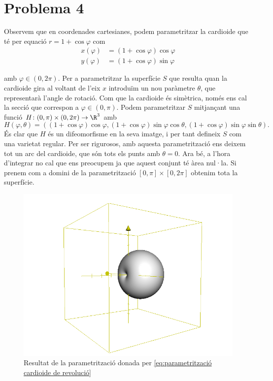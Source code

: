 \documentclass[12pt, a4paper]{article}
\begin{document}
\section*{Problema 4} \label{sec:problema 4} 
Observem que en coordenades cartesianes, podem parametritzar la cardioide que té per equació \( r = 1 + \cos{\varphi} \) com
\begin{equation}
  \begin{aligned}
    x(\varphi) &= (1 + \cos{\varphi})\cos{\varphi} \\
    y(\varphi) &= (1 + \cos{\varphi})\sin{\varphi}
  \end{aligned}
	\label{eq:parametrització cardioide de revolució}
\end{equation}

amb \( \varphi \in (0, 2\pi) \). Per a parametritzar la superfície \( S \) que resulta quan la cardioide gira al voltant de l'eix \( x \) introduïm un nou paràmetre \( \theta \), que representarà l'angle de rotació. Com que la cardioide és simètrica, només ens cal la secció que correspon a \( \varphi \in (0, \pi) \). Podem parametritzar \( S \) mitjançant una funció \( H\colon (0,\pi) \times (0,2\pi) \to \R^3 \) amb 
\begin{equation}
  H(\varphi,\theta) = ((1+\cos{\varphi})\cos{\varphi}, (1+\cos{\varphi})\sin{\varphi}\cos{\theta}, (1+\cos{\varphi})\sin{\varphi}\sin{\theta}). \label{eq:cardioide de revolució}
\end{equation}
És clar que \( H \) és un difeomorfisme en la seva imatge, i per tant defineix \( S \) com una varietat regular. Per ser rigurosos, amb aquesta parametrització ens deixem tot un arc del cardioide, que són tots els punts amb \( \theta = 0 \). Ara bé, a l'hora d'integrar no cal que ens preocupem ja que aquest conjunt té àrea nul·la. Si prenem com a domini de la parametrització \( [0,\pi] \times [0,2\pi] \)	obtenim tota la superfície.

\begin{figure}[htb]
  \centering
  \includegraphics[scale = 0.4]{cardioide.jpg}
 	\caption{Resultat de la parametrització donada per \ref{eq:parametrització cardioide de revolució}} 
\end{figure}
\end{document}
